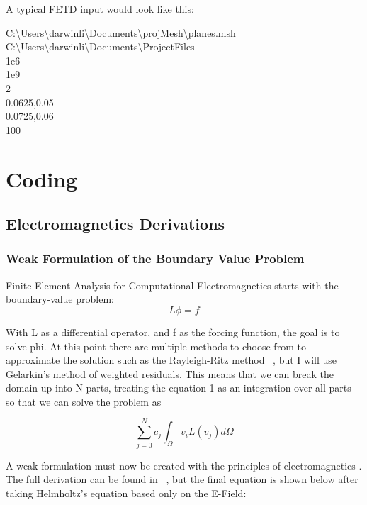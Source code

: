 \documentclass[11pt,a4paper,oldfontcommands]{memoir}
\begin{document}
A typical FETD input would look like this:

C:\textbackslash Users\textbackslash darwinli\textbackslash Documents\textbackslash projMesh\textbackslash  planes.msh
\\C:\textbackslash Users\textbackslash darwinli\textbackslash Documents\textbackslash ProjectFiles
\\1e6
\\1e9
\\2
\\0.0625,0.05
\\0.0725,0.06
\\100




\chapter{Coding}

\section{Electromagnetics Derivations}

\subsection{Weak Formulation of the Boundary Value Problem}
Finite Element Analysis for Computational Electromagnetics starts with the boundary-value problem:
\begin{equation} \label{eq:1}
L\phi = f
\end{equation}

With L as a differential operator, and f as the forcing function, the goal is to solve phi. At this point there are multiple methods to choose from to approximate the solution such as the Rayleigh-Ritz method ~\cite{Jin2}, but I will use Gelarkin’s method of weighted residuals. This means that we can break the domain up into N parts, treating the equation 1 as an integration over all parts so that we can solve the problem as 

\begin{equation} \label{eq:2}
\sum_{j=0}^{N}c_j\int_{\Omega}v_iL(v_j) d\Omega
\end{equation}

A weak formulation must now  be created with the principles of electromagnetics . The full derivation can be found in ~\cite{Jin}, but the final equation is shown below after taking Helmholtz's equation based only on the E-Field:
\end{document}
